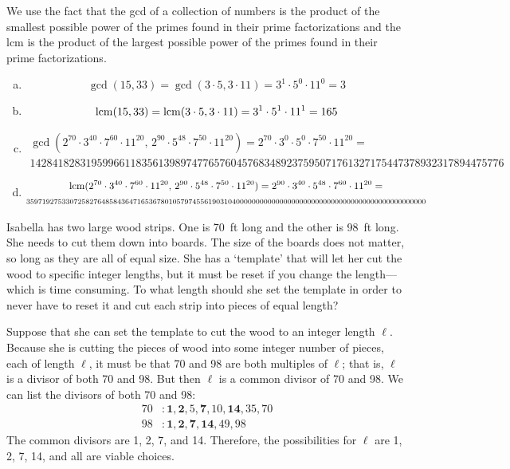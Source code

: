\documentclass[11pt,letterpaper]{article}
\begin{document}
\sol We use the fact that the gcd of a collection of numbers is the product of the smallest possible power of the primes found in their prime factorizations and the lcm is the product of the largest possible power of the primes found in their prime factorizations. 
\begin{enumerate}[(a)]
\item 
	\[
	\gcd(15, 33)= \gcd(3 \cdot 5, 3 \cdot 11)= 3^1 \cdot 5^0 \cdot 11^0= 3
	\] \pspace

\item 
	\[
	\operatorname{lcm}(15, 33)= \operatorname{lcm}(3 \cdot 5, 3 \cdot 11)= 3^1 \cdot 5^1 \cdot 11^1= 165
	\] \pspace

\item 
	\[
	\begin{gathered}
	\gcd(2^{70} \cdot 3^{40} \cdot 7^{60} \cdot 11^{20},\, 2^{90} \cdot 5^{48} \cdot 7^{50} \cdot 11^{20})= 2^{70} \cdot 3^0 \cdot 5^0 \cdot 7^{50} \cdot 11^{20}= \\[0.3cm]
1428418283195996611835613989747765760457683489237595071761327175447378932317894475776
	\end{gathered}
	\] \pspace

\item 
	\[
	\begin{gathered}
	\operatorname{lcm}(2^{70} \cdot 3^{40} \cdot 7^{60} \cdot 11^{20},\, 2^{90} \cdot 5^{48} \cdot 7^{50} \cdot 11^{20})= 2^{90} \cdot 3^{40} \cdot 5^{48} \cdot 7^{60} \cdot 11^{20}= \\ {\scriptstyle 35971927533072582764858436471653678010579745561903104000000000000000000000000000000000000000000000000}
	\end{gathered}
	\] \pspace
\end{enumerate}



\newpage



 Isabella has two large wood strips. One is 70~ft long and the other is 98~ft long. She needs to cut them down into boards. The size of the boards does not matter, so long as they are all of equal size. She has a `template' that will let her cut the wood to specific integer lengths, but it must be reset if you change the length---which is time consuming. To what length should she set the template in order to never have to reset it and cut each strip into pieces of equal length? \pspace

\sol Suppose that she can set the template to cut the wood to an integer length $\ell$. Because she is cutting the pieces of wood into some integer number of pieces, each of length $\ell$, it must be that 70 and 98 are both multiples of $\ell$; that is, $\ell$ is a divisor of both 70 and 98. But then $\ell$ is a common divisor of 70 and 98. We can list the divisors of both 70 and 98:
	\[
	\begin{aligned}
	70&\colon \mathbf{1}, \mathbf{2}, 5, \mathbf{7}, 10, \mathbf{14}, 35, 70 \\
	98&\colon \mathbf{1}, \mathbf{2}, \mathbf{7}, \mathbf{14}, 49, 98
	\end{aligned} 
	\]
The common divisors are 1, 2, 7, and 14. Therefore, the possibilities for $\ell$ are 1, 2, 7, 14, and all are viable choices. \pspace
\end{document}
